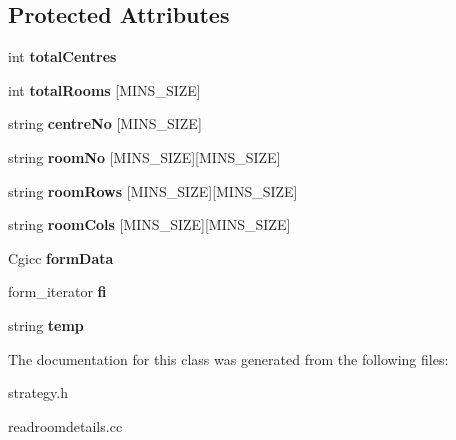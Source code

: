 \subsection*{Protected Attributes}
\begin{DoxyCompactItemize}
\item 
\hypertarget{classReadRoomDetails_aa129e39384751672b59549d8157208a3}{int {\bfseries total\-Centres}}\label{classReadRoomDetails_aa129e39384751672b59549d8157208a3}

\item 
\hypertarget{classReadRoomDetails_ace321366b4a5a91343476cf2c3918eda}{int {\bfseries total\-Rooms} \mbox{[}M\-I\-N\-S\-\_\-\-S\-I\-Z\-E\mbox{]}}\label{classReadRoomDetails_ace321366b4a5a91343476cf2c3918eda}

\item 
\hypertarget{classReadRoomDetails_a7d3fe4925d9d1d61cd1203252fa9520a}{string {\bfseries centre\-No} \mbox{[}M\-I\-N\-S\-\_\-\-S\-I\-Z\-E\mbox{]}}\label{classReadRoomDetails_a7d3fe4925d9d1d61cd1203252fa9520a}

\item 
\hypertarget{classReadRoomDetails_a6b961c05b5c5980de07caec15b25f586}{string {\bfseries room\-No} \mbox{[}M\-I\-N\-S\-\_\-\-S\-I\-Z\-E\mbox{]}\mbox{[}M\-I\-N\-S\-\_\-\-S\-I\-Z\-E\mbox{]}}\label{classReadRoomDetails_a6b961c05b5c5980de07caec15b25f586}

\item 
\hypertarget{classReadRoomDetails_a751d5a539f14f7b1541f24add1a14a8d}{string {\bfseries room\-Rows} \mbox{[}M\-I\-N\-S\-\_\-\-S\-I\-Z\-E\mbox{]}\mbox{[}M\-I\-N\-S\-\_\-\-S\-I\-Z\-E\mbox{]}}\label{classReadRoomDetails_a751d5a539f14f7b1541f24add1a14a8d}

\item 
\hypertarget{classReadRoomDetails_ac9515b760d3bab39cac3673cd276042b}{string {\bfseries room\-Cols} \mbox{[}M\-I\-N\-S\-\_\-\-S\-I\-Z\-E\mbox{]}\mbox{[}M\-I\-N\-S\-\_\-\-S\-I\-Z\-E\mbox{]}}\label{classReadRoomDetails_ac9515b760d3bab39cac3673cd276042b}

\item 
\hypertarget{classReadRoomDetails_a38c9a8165ce1c8078e7843d44a1ba579}{Cgicc {\bfseries form\-Data}}\label{classReadRoomDetails_a38c9a8165ce1c8078e7843d44a1ba579}

\item 
\hypertarget{classReadRoomDetails_a692d9310d1600a6e3bd6cb13247f5ce9}{form\-\_\-iterator {\bfseries fi}}\label{classReadRoomDetails_a692d9310d1600a6e3bd6cb13247f5ce9}

\item 
\hypertarget{classReadRoomDetails_a9d88537ba17a59fb1b1fd54730867969}{string {\bfseries temp}}\label{classReadRoomDetails_a9d88537ba17a59fb1b1fd54730867969}

\end{DoxyCompactItemize}


The documentation for this class was generated from the following files\-:\begin{DoxyCompactItemize}
\item 
strategy.\-h\item 
readroomdetails.\-cc\end{DoxyCompactItemize}

